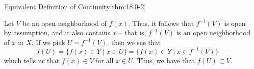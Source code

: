 \begin{thmBox}{Equivalent Definition of Continuity}[thm:18.0-2]
\begin{proofBox}
        \baseSkip

        Let \( V \) be an open neighborhood of \( f ( x ) \).
        Thus, it follows that \( f^{ -1 } ( V ) \) is open by assumption, and
        it also contains \( x \) -- that is, \( f^{ -1 } ( V ) \) is an
        open neighborhood of \( x \) in \( X \).
        If we pick \( U = f^{ -1 } ( V ) \), then we see that 
        \begin{equation*}
            f ( U )
            =
            \{ f ( x ) \in Y \mid x \in U \}
            =
            \{ f ( x ) \in Y \mid x \in f^{ -1 } ( V ) \}
        \end{equation*}
        which tells us that \( f ( x ) \in V \) for all \( x \in U \).
        Thus, we have that \( f ( U ) \subset V \).
    \end{proofBox}
\end{thmBox}

